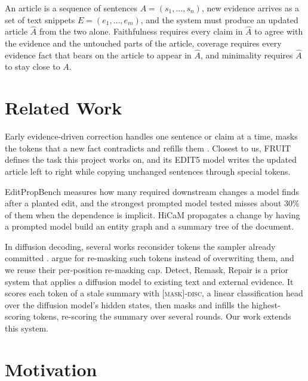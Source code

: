 \documentclass[11pt]{article}
\newcommand{\maskdisc}{\textsc{[mask]-disc}}
\begin{document}
    An article is a sequence of sentences $A = (s_1, \dots, s_n)$, new evidence arrives as a set of text snippets $E = (e_1, \dots, e_m)$, and the system must produce an updated article $\hat{A}$ from the two alone. Faithfulness requires every claim in $\hat{A}$ to agree with the evidence and the untouched parts of the article, coverage requires every evidence fact that bears on the article to appear in $\hat{A}$, and minimality requires $\hat{A}$ to stay close to $A$.

\section{Related Work}
\label{sec:related}

    Early evidence-driven correction handles one sentence or claim at a time, masks the tokens that a new fact contradicts and refills them \citep{shah-etal-2020-automatic, thorne-vlachos-2021-evidence}. Closest to us, FRUIT \citep{iv-etal-2022-fruit} defines the task this project works on, and its EDIT5 model writes the updated article left to right while copying unchanged sentences through special tokens.
    
    EditPropBench \citep{kruthof-2026-editpropbench} measures how many required downstream changes a model finds after a planted edit, and the strongest prompted model tested misses about 30\% of them when the dependence is implicit. HiCaM \citep{shi-etal-2025-hicam} propagates a change by having a prompted model build an entity graph and a summary tree of the document.
    
    In diffusion decoding, several works reconsider tokens the sampler already committed \citep{wang-etal-2025-remasking, bie-etal-2026-llada21}. \citet{yao-2026-remask} argue for re-masking such tokens instead of overwriting them, and we reuse their per-position re-masking cap. Detect, Remask, Repair \citep[DRR;][]{zou-etal-2026-detect} is a prior system that applies a diffusion model to existing text and external evidence. It scores each token of a stale summary with \maskdisc{}, a linear classification head over the diffusion model's hidden states, then masks and infills the highest-scoring tokens, re-scoring the summary over several rounds. Our work extends this system.

\section{Motivation}
\label{sec:motivation}
\end{document}
